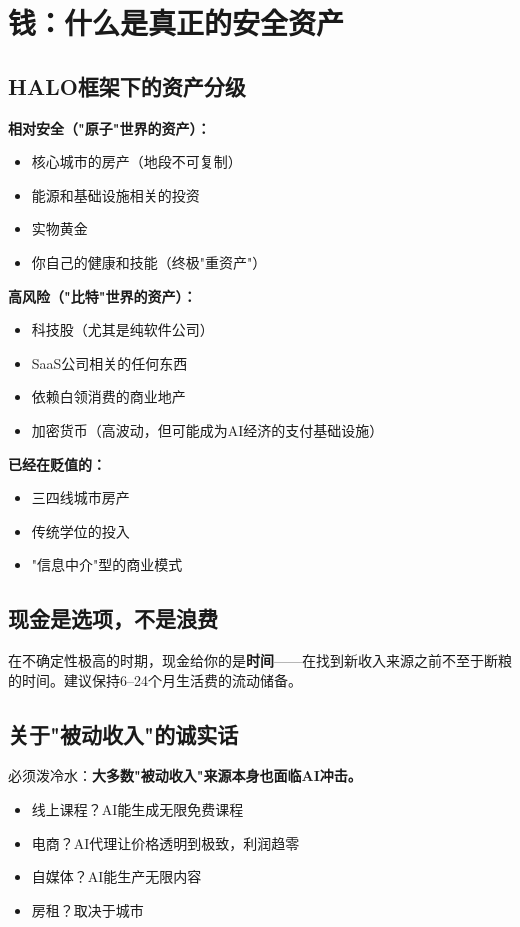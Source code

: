 \documentclass[a4paper,12pt,UTF8]{ctexart}
\begin{document}
\section{钱：什么是真正的安全资产}

\subsection{HALO框架下的资产分级}

\textbf{相对安全（"原子"世界的资产）：}
\begin{itemize}
\item 核心城市的房产（地段不可复制）
\item 能源和基础设施相关的投资
\item 实物黄金
\item 你自己的健康和技能（终极"重资产"）
\end{itemize}

\textbf{高风险（"比特"世界的资产）：}
\begin{itemize}
\item 科技股（尤其是纯软件公司）
\item SaaS公司相关的任何东西
\item 依赖白领消费的商业地产
\item 加密货币（高波动，但可能成为AI经济的支付基础设施）
\end{itemize}

\textbf{已经在贬值的：}
\begin{itemize}
\item 三四线城市房产
\item 传统学位的投入
\item "信息中介"型的商业模式
\end{itemize}

\subsection{现金是选项，不是浪费}

在不确定性极高的时期，现金给你的是\textbf{时间}——在找到新收入来源之前不至于断粮的时间。建议保持6--24个月生活费的流动储备。

\subsection{关于"被动收入"的诚实话}

必须泼冷水：\textbf{大多数"被动收入"来源本身也面临AI冲击。}

\begin{itemize}
\item 线上课程？AI能生成无限免费课程
\item 电商？AI代理让价格透明到极致，利润趋零
\item 自媒体？AI能生产无限内容
\item 房租？取决于城市
\end{itemize}
\end{document}
